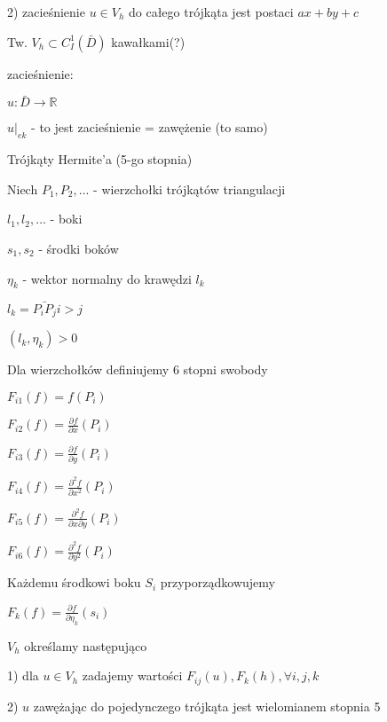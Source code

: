 2) zacieśnienie $u \in V_h$ do całego trójkąta jest postaci $ax+by+c$

Tw. $V_h \subset C_I^1(\bar{D})$ kawałkami(?)

zacieśnienie:

$u: \bar{D} \rightarrow \mathbb{R}$

$u|_{ek}$ - to jest zacieśnienie = zawężenie (to samo)

Trójkąty Hermite'a (5-go stopnia)

Niech $P_1,P_2,...$ - wierzchołki trójkątów triangulacji

$l_1, l_2,...$ - boki

$s_1, s_2$ - środki boków

$\eta _k$ - wektor normalny do krawędzi $l_k$

$l_k = \bar{P_iP_j} i > j$

$(l_k,\eta_k) > 0$

Dla wierzchołków definiujemy 6 stopni swobody

$F_{i1}(f) = f(P_i)$

$F_{i2}(f) = \frac{\partial f}{\partial x}(P_i)$

$F_{i3}(f) = \frac{\partial f}{\partial y}(P_i)$

$F_{i4}(f) = \frac{\partial^2 f}{\partial x^2}(P_i)$

$F_{i5}(f) = \frac{\partial^2 f}{\partial x \partial y}(P_i)$

$F_{i6}(f) = \frac{\partial^2 f}{\partial y^2}(P_i)$

Każdemu środkowi boku $S_i$ przyporządkowujemy

$F_k(f) = \frac{\partial f}{\partial \eta_k}(s_i)$

$V_h$ określamy następująco

1) dla $u \in V_h$ zadajemy wartości $F_{ij}(u), F_k(h), \forall i,j,k$

2) $u$ zawężając do pojedynczego trójkąta jest wielomianem stopnia 5